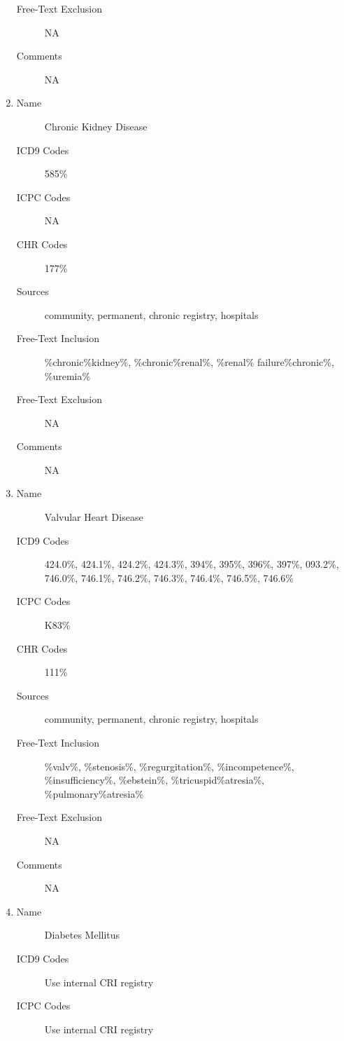 \documentclass[a4paper,12pt]{article}
\begin{document}
\begin{appendices}
\begin{enumerate}
\begin{description}
   						\item[Free-Text Exclusion] NA
   						\item[Comments] NA
   					\end{description}
   					\item
   					\begin{description}
   						\item[Name] Chronic Kidney Disease
   						\item[ICD9 Codes] 585\%
   						\item[ICPC Codes] NA
   						\item[CHR Codes] 177\%
   						\item[Sources] community, permanent, chronic registry, hospitals
   						\item[Free-Text Inclusion] \%chronic\%kidney\%, \%chronic\%renal\%, \%renal\% failure\%chronic\%, \%uremia\%
   						\item[Free-Text Exclusion] NA
   						\item[Comments] NA
   					\end{description}
   					\item
   					\begin{description}
   						\item[Name] Valvular Heart Disease
   						\item[ICD9 Codes] 424.0\%, 424.1\%, 424.2\%, 424.3\%, 394\%, 395\%, 396\%, 397\%, 093.2\%, 746.0\%, 746.1\%, 746.2\%, 746.3\%, 746.4\%, 746.5\%, 746.6\%
   						\item[ICPC Codes] K83\%
   						\item[CHR Codes] 111\%
   						\item[Sources] community, permanent, chronic registry, hospitals
   						\item[Free-Text Inclusion] \%valv\%, \%stenosis\%, \%regurgitation\%, \%incompetence\%, \%insufficiency\%, \%ebstein\%, \%tricuspid\%atresia\%, \%pulmonary\%atresia\%
   						\item[Free-Text Exclusion] NA
   						\item[Comments] NA
   					\end{description}
   					\item
   					\begin{description}
   						\item[Name] Diabetes Mellitus
   						\item[ICD9 Codes] Use internal CRI registry
   						\item[ICPC Codes] Use internal CRI registry

\end{description}
\end{enumerate}
\end{appendices}
\end{document}
